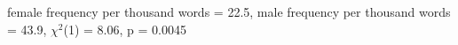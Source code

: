 female frequency per thousand words = 22.5, male frequency per thousand words = 43.9, $\chi^2$(1) = 8.06, p = 0.0045